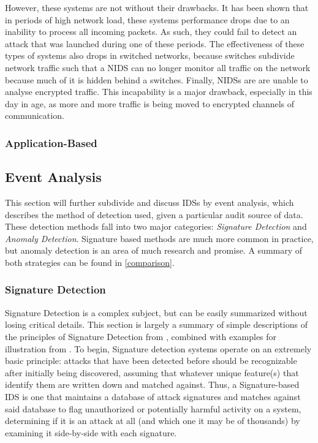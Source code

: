 \documentclass{acm_proc_article-sp}
\begin{document}
    		However, these systems are not without their drawbacks. It has been shown that in periods of high network load, these systems performance drops due to an inability to process all incoming packets. As such, they could fail to detect an attack that was launched during one of these periods. The effectiveness of these types of systems also drops in switched networks, because switches subdivide network traffic such that a NIDS can no longer monitor all traffic on the network because much of it is hidden behind a switches. Finally, NIDSs are are unable to analyse encrypted traffic. This incapability is a major drawback, especially in this day in age, as more and more traffic is being moved to encrypted channels of communication. 		
    	\subsubsection{Application-Based}
    \subsection{Event Analysis}
   	This section will further subdivide and discuss IDSs by event analysis, which describes the method of detection used, given a particular audit source of data. These detection methods fall into two major categories: \emph{Signature Detection} and \emph{Anomaly Detection}. Signature based methods are much more common in practice, but anomaly detection is an area of much research and promise. A summary of both strategies can be found in \ref{comparison}.
	    \subsubsection{Signature Detection} 
	    	Signature Detection is a complex subject, but can be easily summarized without losing critical details. This section is largely a summary of simple descriptions of the principles of Signature Detection from \cite{Taylor2006}, combined with examples for illustration from \cite{Labs1999}. To begin, Signature detection systems operate on an extremely basic principle: attacks that have been detected before should be recognizable after initially being discovered, assuming that whatever unique feature(s) that identify them are written down and matched against. Thus, a Signature-based IDS is one that maintains a database of attack signatures and matches against said database to flag unauthorized or potentially harmful activity on a system, determining if it is an attack at all (and which one it may be of thousands) by examining it side-by-side with each signature. 
	    	
\end{document}
